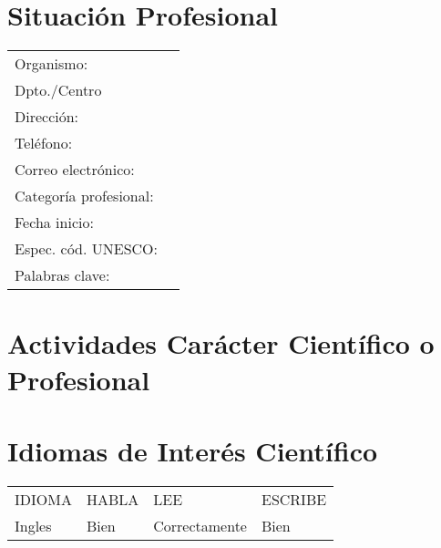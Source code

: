 \documentclass[9pt]{article}
\begin{document}
\section*{Situación Profesional}
\begin{tabular}{ll}
  Organismo: &  \\
  Dpto./Centro &  \\
  Dirección: &  \\
  Teléfono: &  \\
  Correo electrónico: &  \\
  Categoría profesional: &  \\
  Fecha inicio: &  \\
  Espec. cód. UNESCO: &  \\
  Palabras clave: & 
\end{tabular}

\section*{Actividades Carácter Científico o Profesional}
\resizebox{\textwidth}{!}{}

\section*{Idiomas de Interés Científico}
\begin{tabular}{llll}
IDIOMA  & HABLA  & LEE           & ESCRIBE \\
Ingles  & Bien   & Correctamente & Bien
\end{tabular}

\newpage


\renewcommand{\refname}{Participación en Proyectos de Investigación Financiados}


\renewcommand{\refname}{Artículos Publicados en Revistas}


\renewcommand{\refname}{Libros y Capítulos de Libros Publicados}


\renewcommand{\refname}{Artículos Publicados en Congresos}


\renewcommand{\refname}{Participación en Contratos de Investigación
  con Empresas y/o Administraciones}

\end{document}
